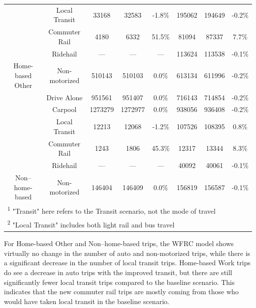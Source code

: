 \documentclass[fancy, oneside, mastersfancy, ms]{byuthesis}
\begin{document}
\begin{table}
{{\begin{tabular}[t]{cccccccc}
 & Local Transit & 33168 & 32583 & -1.8\% & 195062 & 194649 & -0.2\%\\

 & Commuter Rail & 4180 & 6332 & 51.5\% & 81094 & 87337 & 7.7\%\\

 & Ridehail & — & — & — & 113624 & 113538 & -0.1\%\\

\multirow{-6}{*}{\centering\arraybackslash Home-based Other} & Non-motorized & 510143 & 510103 & 0.0\% & 613134 & 611996 & -0.2\%\\
\cmidrule{1-8}
 & Drive Alone & 951561 & 951407 & 0.0\% & 716143 & 714854 & -0.2\%\\

 & Carpool & 1273279 & 1272977 & 0.0\% & 938056 & 936408 & -0.2\%\\

 & Local Transit & 12213 & 12068 & -1.2\% & 107526 & 108395 & 0.8\%\\

 & Commuter Rail & 1243 & 1806 & 45.3\% & 12317 & 13344 & 8.3\%\\

 & Ridehail & — & — & — & 40092 & 40061 & -0.1\%\\

\multirow{-6}{*}{\centering\arraybackslash Non–home-based} & Non-motorized & 146404 & 146409 & 0.0\% & 156819 & 156587 & -0.1\%\\
\bottomrule
\multicolumn{8}{l}{\rule{0pt}{1em}\textsuperscript{1} "Transit" here refers to the Transit scenario, not the mode of travel}\\
\multicolumn{8}{l}{\rule{0pt}{1em}\textsuperscript{2} "Local Transit" includes both light rail and bus travel}\\
\end{tabular}}

}

\end{table}%

For Home-based Other and Non--home-based trips, the WFRC model shows
virtually no change in the number of auto and non-motorized trips, while
there is a significant decrease in the number of local transit trips.
Home-based Work trips do see a decrease in auto trips with the improved
transit, but there are still significantly fewer local transit trips
compared to the baseline scenario. This indicates that the new commuter
rail trips are mostly coming from those who would have taken local
transit in the baseline scenario.
\end{document}

